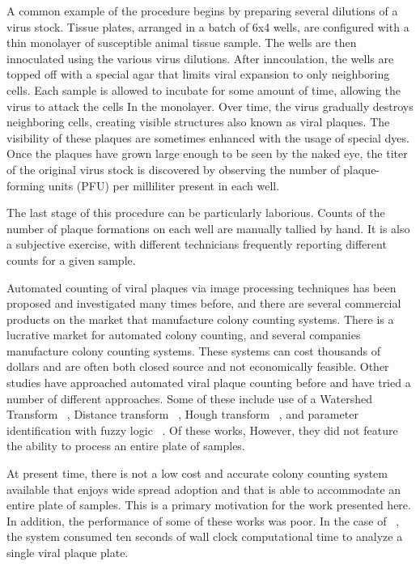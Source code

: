 \documentclass[11pt,final,twocolumn]{IEEEtran}
\begin{document}
A common example of the procedure begins by preparing several dilutions of a virus stock. Tissue plates, arranged in a batch of 6x4 wells, are configured with a thin monolayer of susceptible animal tissue sample.  The wells are then innoculated using the various virus dilutions. After inncoulation, the wells are topped off with a special agar that limits viral expansion to only neighboring cells. Each sample is allowed to incubate for some amount of time, allowing the virus to attack the cells In the monolayer. Over time, the virus gradually destroys neighboring cells, creating visible structures also known as viral plaques. The visibility of these plaques are sometimes enhanced with the usage of special dyes. Once the plaques have grown large enough to be seen by the naked eye, the titer of the original virus stock is discovered by observing the number of  plaque-forming units (PFU) per milliliter present in each well.

The last stage of this procedure can be particularly laborious. Counts of the number of plaque formations on each well are manually tallied by hand. It is also a subjective exercise, with different technicians frequently reporting different counts for a given sample.


Automated counting of viral plaques via image processing techniques  has been proposed and investigated many times before, and there are several commercial products on the market that manufacture colony counting systems. There is a lucrative market for automated colony counting, and several companies manufacture colony counting systems. These systems can cost thousands of dollars and are often both closed source and not economically feasible. Other studies have approached automated viral plaque counting before and have tried a number of different  approaches. Some of these include use of a Watershed Transform ~\cite{watershed}, Distance transform ~\cite{distanceTransform},  Hough transform ~\cite{houghTransform}, and parameter identification with fuzzy logic ~\cite{parameterIdentification}. Of these works, However,  they did not feature the ability to process an entire plate of samples. 

At present time,  there is not a low cost and  accurate colony counting system available that enjoys wide spread adoption and that is able to accommodate an entire plate of samples. This is a primary motivation for the work presented here. In addition, the performance of some of these works was poor. In the case of ~\cite{watershed}, the system consumed ten seconds of wall clock computational time to analyze a single viral plaque plate. 
\end{document}
